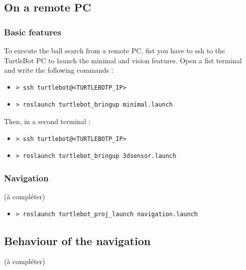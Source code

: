 \documentclass[10pt,a4paper]{article}
\begin{document}
\subsection{On a remote PC}

\subsubsection{Basic features}

To execute the ball search from a remote PC, fist you have to ssh to the TurtleBot PC to launch the minimal and vision features. Open a fist terminal and write the following commands :

\begin{itemize}
\item[]  \begin{verbatim}> ssh turtlebot@<TURTLEBOTP_IP> \end{verbatim}
\item[]  \begin{verbatim}> roslaunch turtlebot_bringup minimal.launch \end{verbatim}
\end{itemize}

Then, in a second terminal :

\begin{itemize}
\item[]  \begin{verbatim}> ssh turtlebot@<TURTLEBOTP_IP> \end{verbatim}
\item[]  \begin{verbatim}> roslaunch turtlebot_bringup 3dsensor.launch \end{verbatim}
\end{itemize}

\subsubsection{Navigation}

(à compléter)

\begin{itemize}
\item[]  \begin{verbatim}> roslaunch turtlebot_proj_launch navigation.launch \end{verbatim}
\end{itemize}

\subsection{Behaviour of the navigation}

(à compléter)
\end{document}
